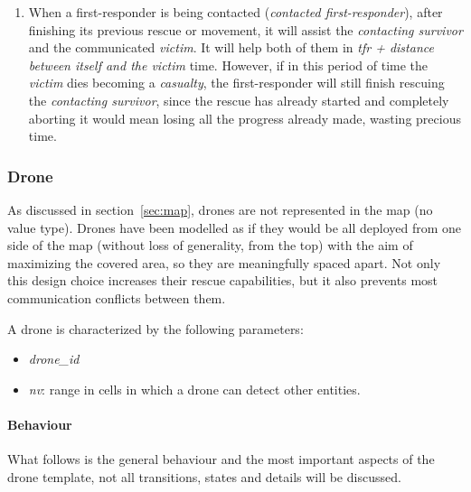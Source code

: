 \begin{enumerate}
	\item When a first-responder is being contacted (\textit{contacted first-responder}), after finishing its previous rescue or movement, it will assist the \textit{contacting survivor} and the communicated \textit{victim}. It will help both of them in \textit{tfr + distance between itself and the victim} time. However, if in this period of time the \textit{victim} dies becoming a \textit{casualty}, the first-responder will still finish rescuing the \textit{contacting survivor}, since the rescue has already started and completely aborting it would mean losing all the progress already made, wasting precious time.
	
\end{enumerate}

\subsubsection{Drone}
\label{sec:drone}
As discussed in section~\ref{sec:map}, drones are not represented in the map (no value type). Drones have been modelled as if they would be all deployed from one side of the map (without loss of generality, from the top) with the aim of maximizing the covered area, so they are meaningfully spaced apart. Not only this design choice increases their rescue capabilities, but it also prevents most communication conflicts between them.\newline

\noindent
A drone is characterized by the following parameters:
\begin{itemize}
	\item \textit{drone\_id}
	\item \textit{nv}: range in cells in which a drone can detect other entities.
\end{itemize}

\paragraph{Behaviour}
What follows is the general behaviour and the most important aspects of the drone template, not all transitions, states and details will be discussed.

